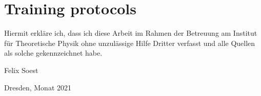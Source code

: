 \chapter{Training protocols}








\clearpage
\thispagestyle{empty}
\vspace*{1.5em}

Hiermit erkläre ich, dass ich diese Arbeit im Rahmen der Betreuung am Institut
für Theoretische Physik ohne unzulässige Hilfe Dritter verfasst und alle Quellen als solche gekennzeichnet habe.

\vspace*{45em}

Felix Soest \par
Dresden, Monat 2021


